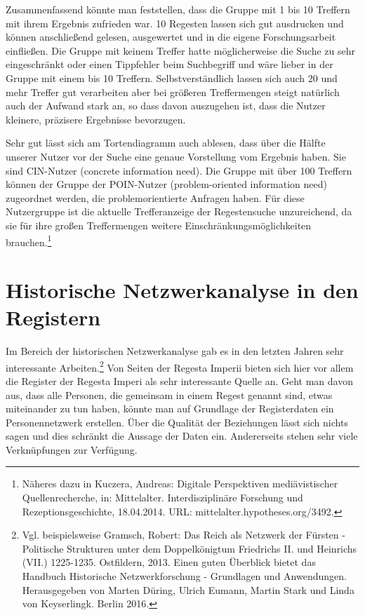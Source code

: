 \documentclass[ngerman,]{scrreprt}
\begin{document}
Zusammenfassend könnte man feststellen, dass die Gruppe mit 1 bis 10 Treffern mit ihrem Ergebnis zufrieden war. 10 Regesten lassen sich gut ausdrucken und können anschließend gelesen, ausgewertet und in die eigene Forschungsarbeit einfließen. Die Gruppe mit keinem Treffer hatte möglicherweise die Suche zu sehr eingeschränkt oder einen Tippfehler beim Suchbegriff und wäre lieber in der Gruppe mit einem bis 10 Treffern. Selbstverständlich lassen sich auch 20 und mehr Treffer gut verarbeiten aber bei größeren Treffermengen steigt natürlich auch der Aufwand stark an, so dass davon auszugehen ist, dass die Nutzer kleinere, präzisere Ergebnisse bevorzugen.

Sehr gut lässt sich am Tortendiagramm auch ablesen, dass über die Hälfte unserer Nutzer vor der Suche eine genaue Vorstellung vom Ergebnis haben. Sie sind CIN-Nutzer (concrete information need). Die Gruppe mit über 100 Treffern können der Gruppe der POIN-Nutzer (problem-oriented information need) zugeordnet werden, die problemorientierte Anfragen haben. Für diese Nutzergruppe ist die aktuelle Trefferanzeige der Regestensuche unzureichend, da sie für ihre großen Treffermengen weitere Einschränkungsmöglichkeiten brauchen.\footnote{Näheres dazu in Kuczera, Andreas: Digitale Perspektiven mediävistischer Quellenrecherche, in: Mittelalter. Interdisziplinäre Forschung und Rezeptionsgeschichte, 18.04.2014. URL: mittelalter.hypotheses.org/3492.}

\hypertarget{historische-netzwerkanalyse-in-den-registern}{%
\section{Historische Netzwerkanalyse in den Registern}\label{historische-netzwerkanalyse-in-den-registern}}

Im Bereich der historischen Netzwerkanalyse gab es in den letzten Jahren sehr interessante Arbeiten.\footnote{Vgl. beispielsweise Gramsch, Robert: Das Reich als Netzwerk der Fürsten - Politische Strukturen unter dem Doppelkönigtum Friedrichs II. und Heinrichs (VII.) 1225-1235. Ostfildern, 2013. Einen guten Überblick bietet das Handbuch Historische Netzwerkforschung - Grundlagen und Anwendungen. Herausgegeben von Marten Düring, Ulrich Eumann, Martin Stark und Linda von Keyserlingk. Berlin 2016.} Von Seiten der Regesta Imperii bieten sich hier vor allem die Register der Regesta Imperi als sehr interessante Quelle an. Geht man davon aus, dass alle Personen, die gemeinsam in einem Regest genannt sind, etwas miteinander zu tun haben, könnte man auf Grundlage der Registerdaten ein Personennetzwerk erstellen. Über die Qualität der Beziehungen lässt sich nichts sagen und dies schränkt die Aussage der Daten ein. Andererseits stehen sehr viele Verknüpfungen zur Verfügung.
\end{document}
